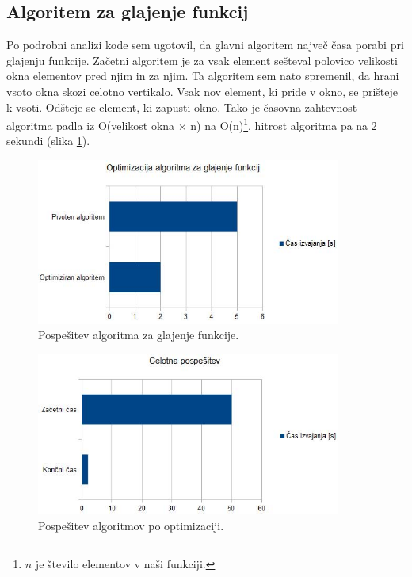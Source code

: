 \documentclass[oneside, a4paper, 12pt]{book}
\begin{document}
\subsection{Algoritem za glajenje funkcij}
Po podrobni analizi kode sem ugotovil, da glavni algoritem največ časa porabi pri glajenju funkcije. Začetni algoritem je za vsak element sešteval polovico velikosti okna elementov pred njim in za njim. Ta algoritem sem nato spremenil, da hrani vsoto okna skozi celotno vertikalo. Vsak nov element, ki pride v okno, se prišteje k vsoti. Odšteje se element, ki zapusti okno. Tako je časovna zahtevnost algoritma padla iz O(velikost okna $\times$ n) na O(n)\footnote{$n$ je število elementov v naši funkciji.}, hitrost algoritma pa na 2 sekundi (slika \ref{pic:opt-g}).


\begin{figure}
\begin{center}
\includegraphics[width=10cm]{slike/optimizacija_grafi/optimizacija-algoritma-za-glajenje-funkcij.jpg}
\end{center}
\caption{Pospešitev algoritma za glajenje funkcije.}
\label{pic:opt-g}
\end{figure}

\begin{figure}
\begin{center}
\includegraphics[width=10cm]{slike/optimizacija_grafi/celotna-pospesitev.jpg}
\end{center}
\caption{Pospešitev algoritmov po optimizaciji.}
\label{pic:opt-c}
\end{figure}
\end{document}
